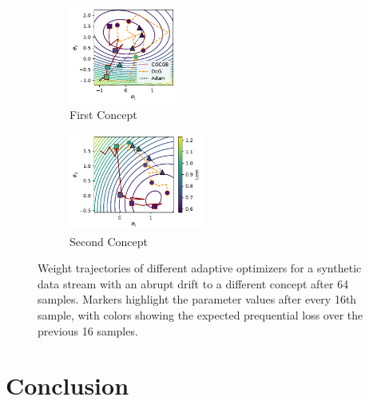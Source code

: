 \documentclass[letterpaper]{article} %
\begin{document}
\begin{figure}
	\centering
	\begin{subfigure}[h]{0.2\textwidth}
		\centering
		\includegraphics[height=3.2cm, keepaspectratio]{figures/sgd_trajectory_optims1.pdf}
		\caption{First Concept}\label{fig:trajectory_batch_sizes_optims1}
	\end{subfigure}
	\begin{subfigure}[h]{0.26\textwidth}
		\centering
		\includegraphics[height=3.2cm, keepaspectratio]{figures/sgd_trajectory_optims2.pdf}
		\caption{Second Concept}\label{fig:trajectory_batch_sizes_optims2}
	\end{subfigure}
	\caption{Weight trajectories of different adaptive optimizers for a synthetic data stream with an abrupt drift to a different concept after 64 samples. Markers highlight the parameter values after every 16th sample, with colors showing the expected prequential loss over the previous 16 samples. }\label{fig:trajectory_optims}
\end{figure}

\section{Conclusion}



\end{document}
